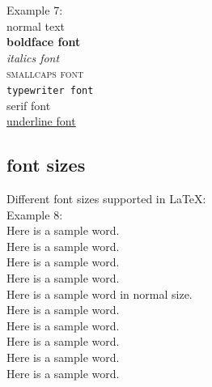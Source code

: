 \documentclass[12pt]{article}
\begin{document}
\noindent Example 7:\\
normal text\\
\textbf{boldface font}\\
\textit{italics font}\\
\textsc{smallcaps font}\\
\texttt{typewriter font}\\
\textsf{serif font}\\
\underline{underline font}\\

\subsection{font sizes}

Different font sizes supported in \LaTeX:\\

\noindent Example 8:\\
Here is a {\tiny sample word}.\\
Here is a {\scriptsize sample word}.\\
Here is a {\footnotesize sample word}.\\
Here is a {\small sample word}.\\
Here is a sample word in normal size.\\
Here is a {\large sample word}.\\
Here is a {\Large sample word}.\\
Here is a {\LARGE sample word}.\\
Here is a {\huge sample word}.\\
Here is a {\Huge sample word}.\\
\end{document}
